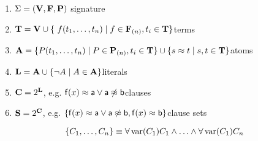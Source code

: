 \documentclass[ 
xcolor={usenames,dvipsnames,svgnames,tablem} 
,handout
]{beamer}
\begin{document}
\begin{frame}

\begin{notation}
\begin{enumerate}
\item $\Sigma = ({\bf V}, {\bf F}, {\bf P})$ \hfill signature
\item $\SIGT = \SIGV \cup \{ f(t_1,\ldots,t_n)\mid f\in\SIGF_{(n)}, t_i \in \SIGT \}$\hfill terms
\item ${\bf A} = \{ P ( t_1, \ldots, t_n )\mid P\in{\bf P}_{(n)}, t_i \in {\bf T}\}
\cup
\{ s \approx t \mid s,t\in {\bf T}\}$\hfill  atoms
%	
\item ${\bf L} = {\bf A} \cup \{ \lnot A \mid A\in {\bf A} \}$\hfill literals
\item ${\bf C} = 2^{\bf L}$, e.g. ${\mathsf f}(x)\approx{\mathsf a} \lor {\mathsf a}\not\approx{\mathsf b}$\hfill clauses
\item ${\bf S} = 2^{\bf C}$, e.g. $\{ {\mathsf f}(x)\approx{\mathsf a} \lor {\mathsf a}\not\approx{\mathsf b}, {\mathsf f}(x)\approx{\mathsf b}\}$\hfill clause sets
\end{enumerate}
\[
\{ C_1, \ldots, C_n \} \equiv 
\forall\operatorname{var}(C_1) C_1 
\land \ldots \land
\forall \operatorname{var}(C_1) C_n 
\]



\end{notation}

\end{frame}
\end{document}
